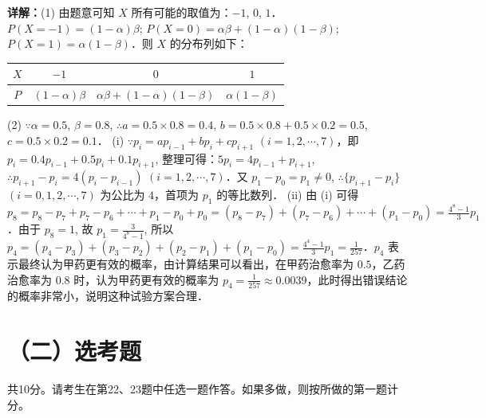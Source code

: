 \begin{question}[points=12]
\begin{solution}
\textbf{详解：}(1) 由题意可知 $X$ 所有可能的取值为：$-1$, $0$, $1$．$P(X = -1) = (1 - \alpha)\beta$; $P(X = 0) = \alpha\beta + (1 - \alpha)(1 - \beta)$; $P(X = 1) = \alpha(1 - \beta)$．则 $X$ 的分布列如下：
\begin{center}
\begin{tabular}{c|c|c|c}
$X$ & $-1$ & $0$ & $1$ \\ \hline
$P$ & $(1-\alpha)\beta$ & $\alpha\beta + (1-\alpha)(1-\beta)$ & $\alpha(1-\beta)$
\end{tabular}
\end{center}
(2) $\because \alpha = 0.5$, $\beta = 0.8$, $\therefore a = 0.5 \times 0.8 = 0.4$, $b = 0.5 \times 0.8 + 0.5 \times 0.2 = 0.5$, $c = 0.5 \times 0.2 = 0.1$．
(i) $\because p_i = a p_{i-1} + b p_i + c p_{i+1}$ $(i = 1,2,\cdots,7)$，即 $p_i = 0.4p_{i-1} + 0.5p_i + 0.1p_{i+1}$, 整理可得：$5p_i = 4p_{i-1} + p_{i+1}$, $\therefore p_{i+1} - p_i = 4(p_i - p_{i-1})$ $(i = 1,2,\cdots,7)$．又 $p_1 - p_0 = p_1 \neq 0$, $\therefore \{p_{i+1} - p_i\}$ $(i = 0,1,2,\cdots,7)$ 为公比为 $4$，首项为 $p_1$ 的等比数列．
(ii) 由 (i) 可得 $p_8 = p_8 - p_7 + p_7 - p_6 + \cdots + p_1 - p_0 + p_0 = (p_8 - p_7) + (p_7 - p_6) + \cdots + (p_1 - p_0) = \frac{4^8 - 1}{3}p_1$．由于 $p_8 = 1$, 故 $p_1 = \frac{3}{4^8 - 1}$, 所以 $p_4 = (p_4 - p_3) + (p_3 - p_2) + (p_2 - p_1) + (p_1 - p_0) = \frac{4^4 - 1}{3}p_1 = \frac{1}{257}$．$p_4$ 表示最终认为甲药更有效的概率，由计算结果可以看出，在甲药治愈率为 $0.5$，乙药治愈率为 $0.8$ 时，认为甲药更有效的概率为 $p_4 = \frac{1}{257} \approx 0.0039$，此时得出错误结论的概率非常小，说明这种试验方案合理．
\end{solution}
\end{question}

\section*{（二）选考题}
共10分。请考生在第22、23题中任选一题作答。如果多做，则按所做的第一题计分。


